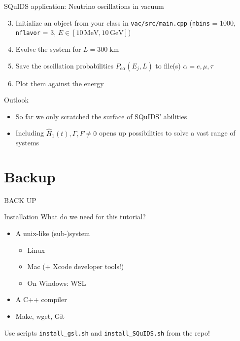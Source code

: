 \documentclass[]{beamer}
\newcommand{\backupbegin}{
	\newcounter{finalframe}
	\setcounter{finalframe}{\value{framenumber}}
}
\begin{document}
\begin{frame}{SQuIDS application: Neutrino oscillations in vacuum}
  \begin{enumerate}
    \setcounter{enumi}{2}
    \item Initialize an object from your class in \texttt{vac/src/main.cpp} (\texttt{nbins} = 1000, \texttt{nflavor} = 3, \(E \in [10 \,\mathrm{MeV}, 10 \,\mathrm{GeV}]\))
    \item Evolve the system for \(L = 300 \; \mathrm{km}\)
    \item Save the oscillation probabilities \(P_{e\alpha}(E_j, L)\) to file(s) \(\alpha = e, \mu, \tau\)
    \item Plot them against the energy
  \end{enumerate}
\end{frame}

\begin{frame}{Outlook}
  \begin{itemize}
    \item So far we only scratched the surface of SQuIDS' abilities
    \item Including \(\hat{H}_1(t), \Gamma, F \neq 0\) opens up possibilities to solve a vast range of systems
  \end{itemize}
\end{frame}

\appendix

\section{Backup}
\backupbegin

\begin{frame}
    \centering \Huge BACK UP
\end{frame}

\begin{frame}{Installation}
  What do we need for this tutorial?
  \begin{itemize}
    \item A unix-like (sub-)system 
    \begin{itemize}
      \item Linux
      \item Mac (+ Xcode developer tools!)
      \item On Windows: WSL
    \end{itemize}
    \item A C++ compiler
    \item Make, wget, Git
  \end{itemize}
  Use scripts \texttt{install\_gsl.sh} and \texttt{install\_SQuIDS.sh} from the repo!
\end{frame}
\end{document}
